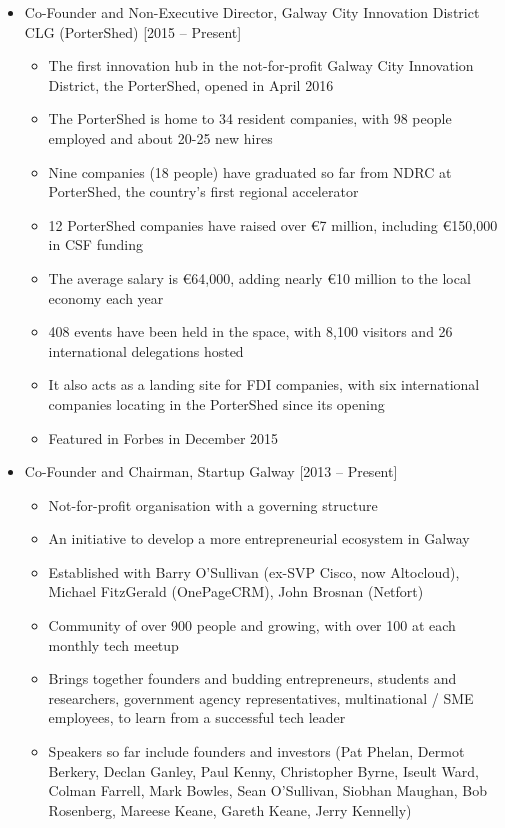 \documentclass[10pt,a4paper]{res} %
\begin{document}
\begin{resume}
\begin{itemize} \itemsep -2pt
\item Co-Founder and Non-Executive Director, Galway City Innovation District CLG (PorterShed) [2015 -- Present]
\begin{itemize} \itemsep -2pt
\item The first innovation hub in the not-for-profit Galway City Innovation District, the PorterShed, opened in April 2016
\item The PorterShed is home to 34 resident companies, with 98 people employed and about 20-25 new hires
\item Nine companies (18 people) have graduated so far from NDRC at PorterShed, the country's first regional accelerator
\item 12 PorterShed companies have raised over \euro{}7 million, including \euro{}150,000 in CSF funding
\item The average salary is \euro{}64,000, adding nearly \euro{}10 million to the local economy each year
\item 408 events have been held in the space, with 8,100 visitors and 26 international delegations hosted
\item It also acts as a landing site for FDI companies, with six international companies locating in the PorterShed since its opening
\item Featured in Forbes in December 2015
\end{itemize}
\item Co-Founder and Chairman, Startup Galway [2013 -- Present]
\begin{itemize} \itemsep -2pt
\item Not-for-profit organisation with a governing structure
\item An initiative to develop a more entrepreneurial ecosystem in Galway
\item Established with Barry O'Sullivan (ex-SVP Cisco, now Altocloud), Michael FitzGerald (OnePageCRM), John Brosnan (Netfort)
\item Community of over 900 people and growing, with over 100 at each monthly tech meetup
\item Brings together founders and budding entrepreneurs, students and researchers, government agency representatives, multinational / SME employees, to learn from a successful tech leader
\item Speakers so far include founders and investors (Pat Phelan, Dermot Berkery, Declan Ganley, Paul Kenny, Christopher Byrne, Iseult Ward, Colman Farrell, Mark Bowles, Sean O'Sullivan, Siobhan Maughan, Bob Rosenberg, Mareese Keane, Gareth Keane, Jerry Kennelly)

\end{itemize}
\end{itemize}
\end{resume}
\end{document}
